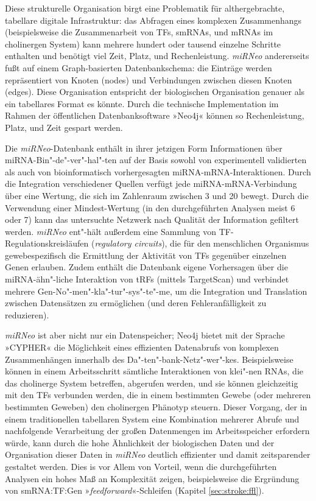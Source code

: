 Diese strukturelle Organisation birgt eine Problematik für althergebrachte, tabellare digitale Infrastruktur: das Abfragen eines komplexen Zusammenhangs (beispielsweise die Zusammenarbeit von TFs, smRNAs, und mRNAs im cholinergen System) kann mehrere hundert oder tausend einzelne Schritte enthalten und benötigt viel Zeit, Platz, und Rechenleistung. \emph{miRNeo} andererseits fußt auf einem Graph-basierten Datenbankschema: die Einträge werden repräsentiert von Knoten (nodes) und Verbindungen zwischen diesen Knoten (edges). Diese Organisation entspricht der biologischen Organisation genauer als ein tabellares Format es könnte. Durch die technische Implementation im Rahmen der öffentlichen Datenbanksoftware »Neo4j« können so Rechenleistung, Platz, und Zeit gespart werden.

Die \emph{miRNeo}-Datenbank enthält in ihrer jetzigen Form Informationen über miRNA-Bin"-de"-ver"-hal"-ten auf der Basis sowohl von experimentell validierten als auch von bioinformatisch vorhergesagten miRNA-mRNA-Interaktionen. Durch die Integration verschiedener Quellen verfügt jede miRNA-mRNA-Verbindung über eine Wertung, die sich im Zahlenraum zwischen 3 und 20 bewegt. Durch die Verwendung einer Mindest-Wertung (in den durchgeführten Analysen meist 6 oder 7) kann das untersuchte Netzwerk nach Qualität der Information gefiltert werden. \emph{miRNeo} ent"-hält außerdem eine Sammlung von TF-Regulationskreisläufen (\emph{regulatory circuits}), die für den menschlichen Organismus gewebespezifisch die Ermittlung der Aktivität von TFs gegenüber einzelnen Genen erlauben. Zudem enthält die Datenbank eigene Vorhersagen über die miRNA-ähn"-liche Interaktion von tRFs (mittels TargetScan) und verbindet mehrere Gen-No"-men"-kla"-tur"-sys"-te"-me, um die Integration und Translation zwischen Datensätzen zu ermöglichen (und deren Fehleranfälligkeit zu reduzieren).

\emph{miRNeo} ist aber nicht nur ein Datenspeicher; Neo4j bietet mit der Sprache »CYPHER« die Möglichkeit eines effizienten Datenabrufs von komplexen Zusammenhängen innerhalb des Da"-ten"-bank-Netz"-wer"-kes. Beispielsweise können in einem Arbeitsschritt sämtliche Interaktionen von klei"-nen RNAs, die das cholinerge System betreffen, abgerufen werden, und sie können gleichzeitig mit den TFs verbunden werden, die in einem bestimmten Gewebe (oder mehreren bestimmten Geweben) den cholinergen Phänotyp steuern. Dieser Vorgang, der in einem traditionellen tabellaren System eine Kombination mehrerer Abrufe und nachfolgende Verarbeitung der großen Datenmengen im Arbeitsspeicher erfordern würde, kann durch die hohe Ähnlichkeit der biologischen Daten und der Organisation dieser Daten in \emph{miRNeo} deutlich effizienter und damit zeitsparender gestaltet werden. Dies is vor Allem von Vorteil, wenn die durchgeführten Analysen ein hohes Maß an Komplexität zeigen, beispielsweise die Ergründung von smRNA:TF:Gen »\emph{feedforward}«-Schleifen (Kapitel \ref{sec:stroke:ffl}).

